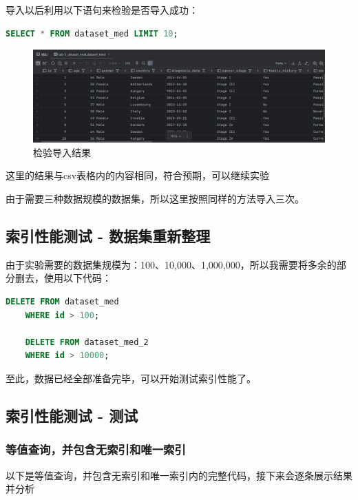 \documentclass{article}
\begin{document}
	导入以后利用以下语句来检验是否导入成功：
	
	\begin{lstlisting}[language=sql, title=检验是否导入成功, tabsize=4]
	SELECT * FROM dataset_med LIMIT 10;
	\end{lstlisting}
	
	\begin{figure}[H]
		\centering
		\includegraphics[width=13cm]{./images/8.检验导入结果.png}
		\caption{检验导入结果}
	\end{figure}
	
	这里的结果与csv表格内的内容相同，符合预期，可以继续实验
	
	由于需要三种数据规模的数据集，所以这里按照同样的方法导入三次。
	
	\subsection{索引性能测试 - 数据集重新整理}
	
	由于实验需要的数据集规模为：100、10,000、1,000,000，所以我需要将多余的部分删去，使用以下代码：
	
	\begin{lstlisting}[language=sql, title=删去多余的数据, tabsize=4]
	DELETE FROM dataset_med
	WHERE id > 100;
	
	DELETE FROM dataset_med_2
	WHERE id > 10000;
	\end{lstlisting}
	
	至此，数据已经全部准备完毕，可以开始测试索引性能了。
	
	\subsection{索引性能测试 - 测试}
	
	\subsubsection{等值查询，并包含无索引和唯一索引}
	
	以下是等值查询，并包含无索引和唯一索引内的完整代码，接下来会逐条展示结果并分析
	
\end{document}

